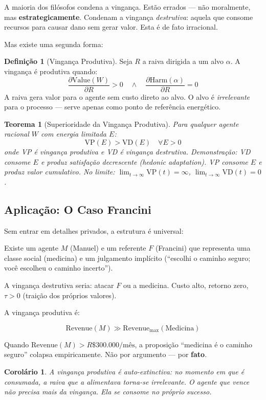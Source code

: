 \documentclass[12pt, a4paper]{article}
\newtheorem{teorema}{Teorema}
\newtheorem{corolario}{Corolário}
\theoremstyle{definition}
\newtheorem{definicao}{Definição}
\theoremstyle{remark}
\begin{document}
A maioria dos filósofos condena a vingança. Estão errados — não moralmente, mas \textbf{estrategicamente}. Condenam a vingança \textit{destrutiva}: aquela que consome recursos para causar dano sem gerar valor. Esta é de fato irracional.

Mas existe uma segunda forma:

\begin{definicao}[Vingança Produtiva]
Seja $R$ a raiva dirigida a um alvo $\alpha$. A vingança é produtiva quando:
\[
\frac{\partial \text{Value}(W)}{\partial R} > 0 \quad \land \quad \frac{\partial \text{Harm}(\alpha)}{\partial R} = 0
\]
A raiva gera valor para o agente sem custo direto ao alvo. O alvo é \textit{irrelevante} para o processo — serve apenas como ponto de referência energético.
\end{definicao}

\begin{teorema}[Superioridade da Vingança Produtiva]
Para qualquer agente racional $W$ com energia limitada $E$:
\[
\text{VP}(E) > \text{VD}(E) \quad \forall E > 0
\]
onde VP é vingança produtiva e VD é vingança destrutiva. Demonstração: VD consome $E$ e produz satisfação decrescente (hedonic adaptation). VP consome $E$ e produz valor cumulativo. No limite: $\lim_{t\to\infty} \text{VP}(t) = \infty$, $\lim_{t\to\infty} \text{VD}(t) = 0$.
\end{teorema}

\subsection{Aplicação: O Caso Francini}

Sem entrar em detalhes privados, a estrutura é universal:

Existe um agente $M$ (Manuel) e um referente $F$ (Francini) que representa uma classe social (medicina) e um julgamento implícito (``escolhi o caminho seguro; você escolheu o caminho incerto'').

A vingança destrutiva seria: atacar $F$ ou a medicina. Custo alto, retorno zero, $\tau > 0$ (traição dos próprios valores).

A vingança produtiva é:

\[
\text{Revenue}(M) \gg \text{Revenue}_{\max}(\text{Medicina})
\]

Quando $\text{Revenue}(M) > R\$300.000/\text{mês}$, a proposição ``medicina é o caminho seguro'' colapsa empiricamente. Não por argumento — por \textbf{fato}.

\begin{corolario}
A vingança produtiva é auto-extinctiva: no momento em que é consumada, a raiva que a alimentava torna-se irrelevante. O agente que vence não precisa mais da vingança. Ela se consome no próprio sucesso.
\end{corolario}
\end{document}
